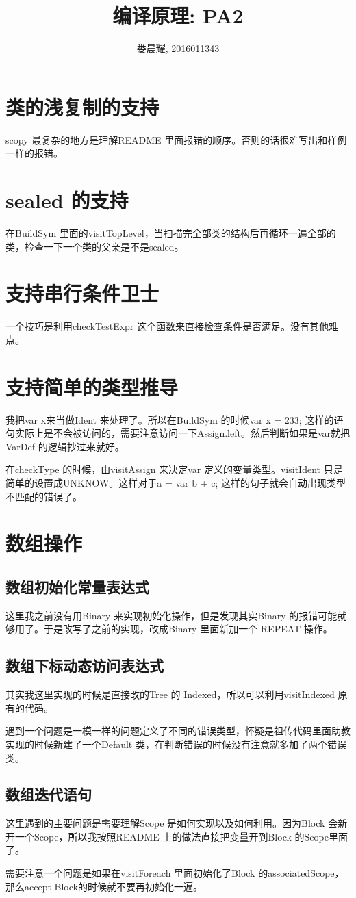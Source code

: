 \documentclass{article}
\title{编译原理: PA2}
\author{娄晨耀, 2016011343}
\date{}
\theoremstyle{plain}
\theoremstyle{definition}
\begin{document}
    \maketitle

    \section{类的浅复制的支持}

    scopy 最复杂的地方是理解README 里面报错的顺序。否则的话很难写出和样例一样的报错。

    \section{sealed 的支持}

    在BuildSym 里面的visitTopLevel，当扫描完全部类的结构后再循环一遍全部的类，检查一下一个类的父亲是不是sealed。

    \section{支持串行条件卫士}

    一个技巧是利用checkTestExpr 这个函数来直接检查条件是否满足。没有其他难点。
    
    \section{支持简单的类型推导}

    我把var x来当做Ident 来处理了。所以在BuildSym 的时候var x = 233; 这样的语句实际上是不会被访问的，需要注意访问一下Assign.left。然后判断如果是var就把VarDef 的逻辑抄过来就好。

    在checkType 的时候，由visitAssign 来决定var 定义的变量类型。visitIdent 只是简单的设置成UNKNOW。这样对于a = var b + c; 这样的句子就会自动出现类型不匹配的错误了。
    
    \section{数组操作}
    \subsection{数组初始化常量表达式}
    这里我之前没有用Binary 来实现初始化操作，但是发现其实Binary 的报错可能就够用了。于是改写了之前的实现，改成Binary 里面新加一个 REPEAT 操作。
    
    \subsection{数组下标动态访问表达式}
    其实我这里实现的时候是直接改的Tree 的 Indexed，所以可以利用visitIndexed 原有的代码。

    遇到一个问题是一模一样的问题定义了不同的错误类型，怀疑是祖传代码里面助教实现的时候新建了一个Default 类，在判断错误的时候没有注意就多加了两个错误类。

    \subsection{数组迭代语句}
    这里遇到的主要问题是需要理解Scope 是如何实现以及如何利用。因为Block 会新开一个Scope，所以我按照README 上的做法直接把变量开到Block 的Scope里面了。

    需要注意一个问题是如果在visitForeach 里面初始化了Block 的associatedScope，那么accept Block的时候就不要再初始化一遍。


    
\end{document}
